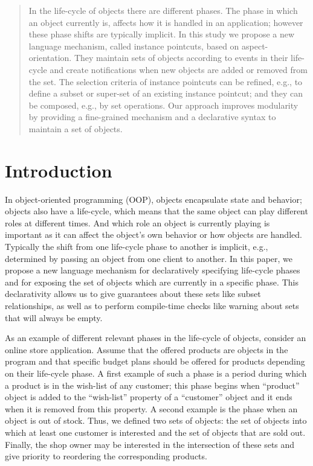 
\maketitle

\begin{abstract}
In the life-cycle of objects there are different phases. The phase in which an object currently is, affects how it is handled in an application; however these phase shifts are typically implicit.
In this study we propose a new language mechanism, called instance pointcuts, based on aspect-orientation.
They maintain sets of objects according to events in their life-cycle and create notifications when new objects are added or removed from the set.
The selection criteria of instance pointcuts can be refined, e.g., to define a subset or super-set of an existing instance pointcut; and they can be composed, e.g., by set operations.
Our approach improves modularity by providing a fine-grained mechanism and a declarative syntax to maintain a set of objects.
\end{abstract}

\section{Introduction}
In object-oriented programming (OOP), objects encapsulate state and behavior; objects also have a life-cycle, which means that the same object can play different roles at different times. And which role an object is currently playing is important as it can affect the object's own behavior or how objects are handled. Typically the shift from one life-cycle phase to another is implicit, e.g., determined by passing an object from one client to another. In this paper, we propose a new language mechanism for declaratively specifying life-cycle phases and for exposing the set of objects which are currently in a specific phase. This declarativity allows us to give guarantees about these sets like subset relationships, as well as to perform compile-time checks like warning about sets that will always be empty.

As an example of different relevant phases in the life-cycle of objects, consider an online store application. Assume that the offered products are objects in the program and that specific budget plans should be offered for products depending on their life-cycle phase. A first example of such a phase is a period during which a product is in the wish-list of any customer; this phase begins when ``product'' object is added to the ``wish-list'' property of a ``customer'' object and it ends when it is removed from this property. A second example is the phase when an object is out of stock. Thus, we defined two sets of objects: the set of objects into which at least one customer is interested and the set of objects that are sold out. Finally, the shop owner may be interested in the intersection of these sets and give priority to reordering the corresponding products.

